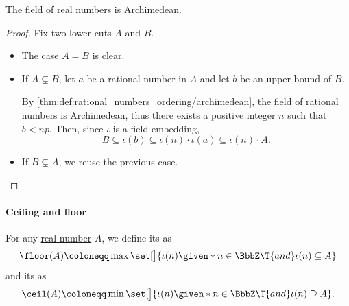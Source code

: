 \begin{proposition}\label{thm:real_numbers_archimedean}
  The field of real numbers is \hyperref[def:archimedean_semiring]{Archimedean}.
\end{proposition}
\begin{proof}
  Fix two lower cuts \( A \) and \( B \).

  \begin{itemize}
    \item The case \( A = B \) is clear.

    \item If \( A \subsetneq B \), let \( a \) be a rational number in \( A \) and let \( b \) be an upper bound of \( B \).

    By \cref{thm:def:rational_numbers_ordering/archimedean}, the field of rational numbers is Archimedean, thus there exists a positive integer \( n \) such that \( b < np \). Then, since \( \iota \) is a field embedding,
    \begin{equation*}
      B \subseteq \iota(b) \subseteq \iota(n) \cdot \iota(a) \subseteq \iota(n) \cdot A.
    \end{equation*}

    \item If \( B \subsetneq A \), we reuse the previous case.
  \end{itemize}
\end{proof}

\paragraph{Ceiling and floor}

\begin{definition}\label{def:real_floor_ceiling}\mimprovised
  For any \hyperref[def:real_numbers]{real number} \( A \), we define its  as
  \begin{equation*}
    \floor(A) \coloneqq \max\set[\big]{ \iota(n) \given* n \in \BbbZ \T{and} \iota(n) \subseteq A }
  \end{equation*}
  and its  as
  \begin{equation*}
    \ceil(A) \coloneqq \min\set[\big]{ \iota(n) \given* n \in \BbbZ \T{and} \iota(n) \supseteq A }.
  \end{equation*}
\end{definition}

